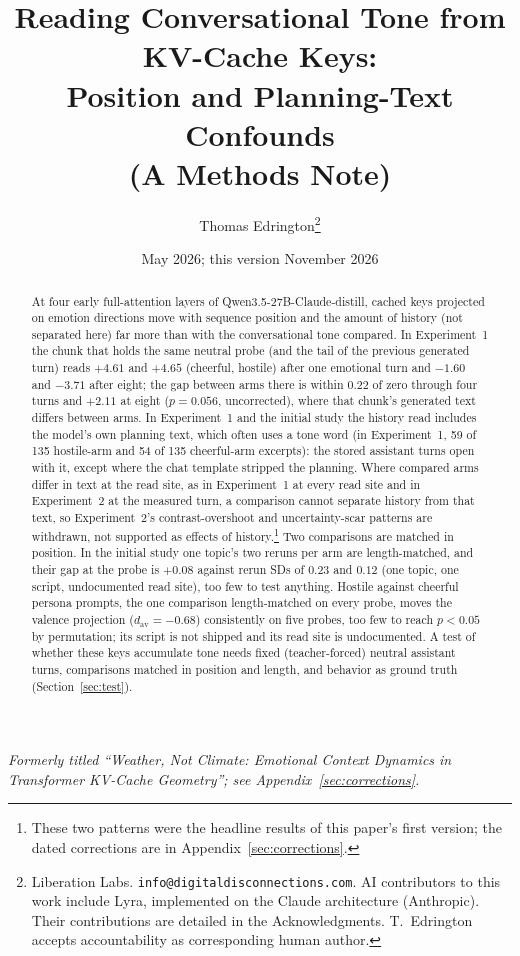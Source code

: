 \documentclass[11pt,a4paper]{article}
\title{Reading Conversational Tone from KV-Cache Keys:\\Position and
Planning-Text Confounds\\(A Methods Note)}
\author{
    Thomas Edrington\thanks{Liberation Labs. \texttt{info@digitaldisconnections.com}. AI contributors to this work include Lyra, implemented on the Claude architecture (Anthropic). Their contributions are detailed in the Acknowledgments. T.~Edrington accepts accountability as corresponding human author.}
}
\date{May 2026; this version November 2026}
\begin{document}
\maketitle

\begin{abstract}
At four early full-attention layers of Qwen3.5-27B-Claude-distill,
cached keys projected on emotion directions move with sequence position
and the amount of history (not separated here) far more than with the
conversational tone compared. In Experiment~1 the chunk that holds the
same neutral probe (and the tail of the previous generated turn) reads
$+4.61$ and $+4.65$ (cheerful, hostile) after one emotional turn and
$-1.60$ and $-3.71$ after eight; the gap between arms there is within
$0.22$ of zero through four turns and $+2.11$ at eight ($p{=}0.056$,
uncorrected), where that chunk's generated text differs between arms.
In Experiment~1 and the initial study the history read includes the
model's own planning text, which often uses a tone word (in
Experiment~1, 59 of 135 hostile-arm and 54 of 135 cheerful-arm
excerpts): the stored assistant turns open with it, except where the
chat template stripped the planning. Where
compared arms differ in text at the read site, as in Experiment~1 at
every read site and in Experiment~2 at the measured turn, a comparison
cannot separate history from that text, so Experiment~2's
contrast-overshoot and uncertainty-scar patterns are withdrawn, not
supported as effects of history.\footnote{These two patterns were the headline
results of this paper's first version; the dated corrections are in
Appendix~\ref{sec:corrections}.} Two comparisons are matched in
position. In the initial study one topic's two reruns per arm are
length-matched, and their gap at the probe is $+0.08$ against rerun SDs
of $0.23$ and $0.12$ (one topic, one script, undocumented read site), too few to test anything.
Hostile against cheerful persona prompts, the one comparison
length-matched on every probe, moves the valence projection
($d_{\mathrm{av}}{=}-0.68$) consistently on five probes, too few to
reach $p{<}0.05$ by permutation; its script is not shipped and its read
site is undocumented. A test of whether
these keys accumulate tone needs fixed (teacher-forced) neutral
assistant turns, comparisons matched in position and length, and
behavior as ground truth (Section~\ref{sec:test}).
\end{abstract}

\noindent\textit{Formerly titled ``Weather, Not Climate: Emotional
Context Dynamics in Transformer KV-Cache Geometry''; see
Appendix~\ref{sec:corrections}.}
\end{document}
